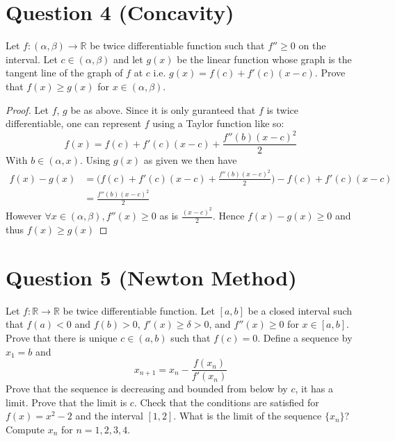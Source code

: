 \documentclass[12pt, letterpaper]{article}
\begin{document}
\section*{Question 4 (Concavity)}
Let $f: (\alpha,\beta)  \rightarrow \mathbb R$ be twice differentiable function such that $f''\geq 0$ on the interval. Let $c\in (\alpha,\beta)$ and let $g(x)$ be the linear
function whose graph is the tangent line of the graph of $f$ at $c$ i.e. $g(x)=f(c) + f'(c)(x-c)$. Prove that $f(x)\geq g(x)$ for $x\in (\alpha,\beta)$.

\begin{proof}
  Let $f$, $g$ be as above. Since it is only guranteed that $f$ is twice differentiable, one can represent $f$ using a Taylor function like so:
  $$ f(x) = f(c) + f'(c)(x - c) +\frac{f''(b)(x - c)^2}{2} $$
  With $b\in(\alpha, x)$. Using $g(x)$ as given we then have
  \begin{align*}
      f(x) - g(x) &= \Big(f(c) + f'(c)(x - c) +\frac{f''(b)(x - c)^2}{2}\Big) - f(c) + f'(c)(x-c)\\
      &= \frac{f''(b)(x - c)^2}{2}
  \end{align*}
  However $\forall x \in (\alpha, \beta), f''(x) \geq 0$ as is $\frac{(x - c)^2}{2}$. Hence $f(x) - g(x) \geq 0$ and thus $f(x) \geq g(x)$
\end{proof}
\pagebreak

\section*{Question 5 (Newton Method)}
Let $f: \mathbb R \rightarrow \mathbb R$ be twice differentiable function. Let $[a,b]$ be a closed interval such that $f(a) <0$ and $f(b)>0$, $f'(x) \geq \delta>0$,
and $f''(x)\geq 0$ for $x\in [a,b]$. Prove that there is unique $c\in (a,b)$ such that $f(c)=0$. Define a sequence by $x_1=b$ and
\[
x_{n+1} = x_n -\frac{f(x_n)}{f'(x_{n})}
\]
Prove that the sequence is decreasing and bounded from below by $c$, it has a limit.
Prove that the limit is $c$.  Check that the conditions are
satisfied for $f(x)=x^2-2$ and the interval
$[1,2]$. What is the limit of the sequence $\{x_n\}$? Compute $x_n$  for $n=1,2,3,4$.\\
\end{document}
